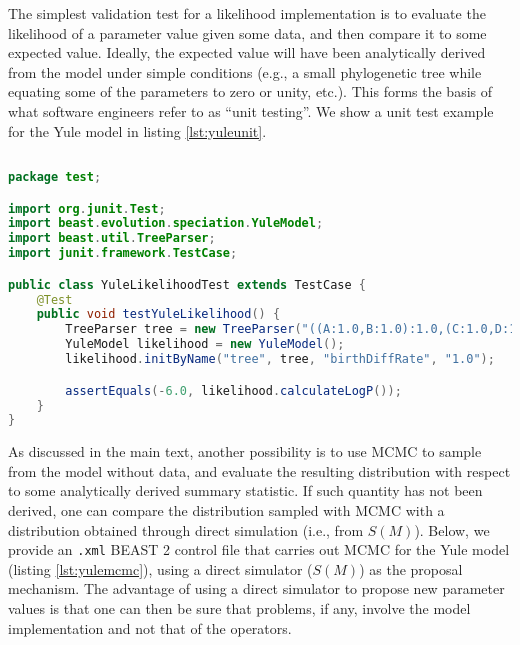 \documentclass[oneside]{article}
\begin{document}
The simplest validation test for a likelihood implementation is to
evaluate the likelihood of a parameter value given some
data, and then compare it to some expected value.
Ideally, the expected value will have been analytically derived from the
model under simple conditions (e.g., a small phylogenetic tree while
equating some of the parameters to zero or unity, etc.).
This forms the basis of what software engineers refer to as ``unit testing''.
We show a unit test example for the Yule model in listing \ref{lst:yuleunit}.

{\small
\vspace{2cm}
\singlespacing
\begin{lstlisting}[language=Java, caption=Java unit test for Yule model
  likelihood function given a small phylogenetic tree.,label={lst:yuleunit}]
  
package test;

import org.junit.Test;
import beast.evolution.speciation.YuleModel;
import beast.util.TreeParser;
import junit.framework.TestCase;

public class YuleLikelihoodTest extends TestCase {
    @Test
    public void testYuleLikelihood() {
        TreeParser tree = new TreeParser("((A:1.0,B:1.0):1.0,(C:1.0,D:1.0):1.0);");
        YuleModel likelihood = new YuleModel();
        likelihood.initByName("tree", tree, "birthDiffRate", "1.0");

        assertEquals(-6.0, likelihood.calculateLogP());
    }
}
\end{lstlisting}
}

As discussed in the main text, another possibility is to use MCMC to
sample from the model without data, and evaluate the resulting
distribution with respect to some analytically derived summary
statistic.
If such quantity has not been derived, one can compare the
distribution sampled with MCMC with a distribution obtained through
direct simulation (i.e., from $S(M)$).
Below, we provide an \texttt{.xml} BEAST 2 control file that carries
out MCMC for the Yule model (listing
\ref{lst:yulemcmc}), using a direct simulator ($S(M)$) as the proposal
mechanism.
The advantage of using a direct simulator to propose new parameter values is
that one can then be sure that problems, if any, involve the model
implementation and not that of the operators. 
\end{document}

